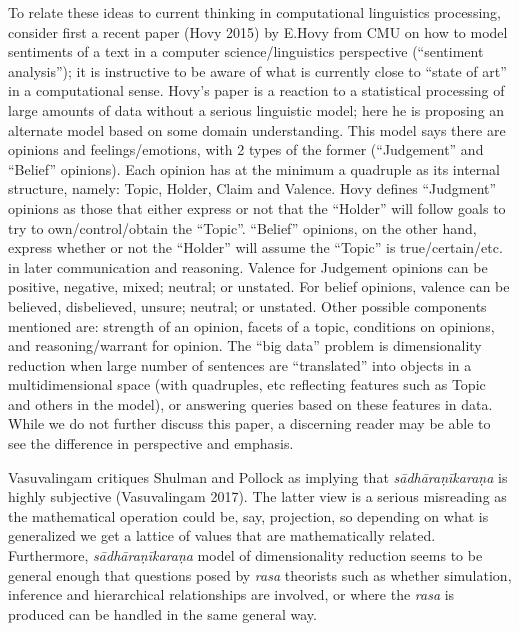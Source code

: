 To relate these ideas to current thinking in computational linguistics processing, consider first a recent paper (Hovy 2015) by E.Hovy from CMU on how to model sentiments of a text in a computer science/linguistics perspective (“sentiment analysis”); it is instructive to be aware of what is currently close to “state of art” in a computational sense. Hovy’s paper is a reaction to a statistical processing of large amounts of data without a serious linguistic model; here he is proposing an alternate model based on some domain understanding. This model says there are opinions and feelings/emotions, with 2 types of the former (“Judgement” and “Belief” opinions). Each opinion has at the minimum a quadruple as its internal structure, namely: Topic, Holder, Claim and Valence. Hovy defines “Judgment” opinions as those that either express or not that the “Holder” will follow goals to try to own/control/obtain the “Topic”. “Belief” opinions, on the other hand, express whether or not the “Holder” will assume the “Topic” is true/certain/etc. in later communication and reasoning. Valence for Judgement opinions can be positive, negative, mixed; neutral; or unstated. For belief opinions, valence can be believed, disbelieved, unsure; neutral; or unstated. Other possible components mentioned are: strength of an opinion, facets of a topic, conditions on opinions, and reasoning/warrant for opinion. The “big data” problem is dimensionality reduction when large number of sentences are “translated” into objects in a multidimensional space (with quadruples, etc reflecting features such as Topic and others in the model), or answering queries based on these features in data. While we do not further discuss this paper, a discerning reader may be able to see the difference in perspective and emphasis.

Vasuvalingam critiques Shulman and Pollock as implying that \textsl{sādhāraṇīkaraṇa} is highly subjective (Vasuvalingam 2017). The latter view is a serious misreading as the mathematical operation could be, say, projection, so depending on what is generalized we get a lattice of values that are mathematically related. Furthermore, \textsl{sādhāraṇīkaraṇa} model of dimensionality reduction seems to be general enough that questions posed by \textsl{rasa} theorists such as whether simulation, inference and hierarchical relationships are involved, or where the \textsl{rasa} is produced can be handled in the same general way.

